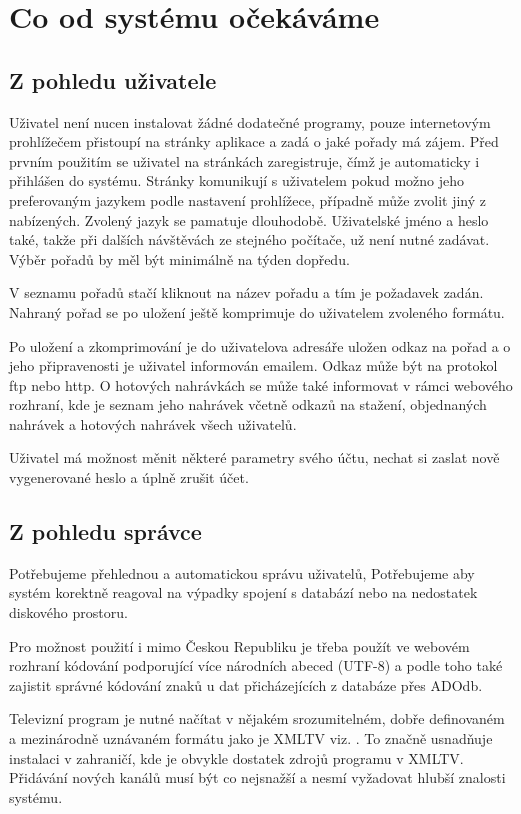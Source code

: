 \chapter{Co od systému očekáváme}

\section{Z pohledu uživatele}
Uživatel není nucen instalovat žádné dodatečné programy, pouze internetovým prohlížečem přistoupí na stránky aplikace a zadá o jaké pořady má zájem. Před prvním použitím se uživatel na stránkách zaregistruje, čímž je automaticky i přihlášen do systému. Stránky komunikují s uživatelem pokud možno jeho preferovaným jazykem podle nastavení prohlížece, případně může zvolit jiný z nabízených. Zvolený jazyk se pamatuje dlouhodobě. Uživatelské jméno a heslo také, takže při dalších návštěvách ze stejného počítače, už není nutné zadávat. Výběr pořadů by měl být minimálně na týden dopředu.

\vspace{10pt}

V seznamu pořadů stačí kliknout na název pořadu a tím je požadavek zadán. Nahraný pořad se po uložení ještě komprimuje do uživatelem zvoleného formátu.

\vspace{10pt}

Po uložení a zkomprimování je do uživatelova adresáře uložen odkaz na pořad a o jeho připravenosti je uživatel informován emailem. Odkaz může být na protokol ftp nebo http. O hotových nahrávkách se může také informovat v rámci webového rozhraní, kde je seznam jeho nahrávek včetně odkazů na stažení, objednaných nahrávek a hotových nahrávek všech uživatelů.

\vspace{10pt}

Uživatel má možnost měnit některé parametry svého účtu, nechat si zaslat nově vygenerované heslo a úplně zrušit účet.

\vspace{10pt}

\section{Z pohledu správce}
Potřebujeme přehlednou a automatickou správu uživatelů, Potřebujeme aby systém korektně reagoval na výpadky spojení s databází nebo na nedostatek diskového prostoru.

Pro možnost použití i mimo Českou Republiku je třeba použít ve webovém rozhraní kódování podporující více národních abeced (UTF-8) a podle toho také zajistit správné kódování znaků u dat přicházejících z databáze přes ADOdb. 

Televizní program je nutné načítat v nějakém srozumitelném, dobře definovaném a mezinárodně uznávaném formátu jako je XMLTV viz. \cite{xmltvURL}. To značně usnadňuje instalaci v zahraničí, kde je obvykle dostatek zdrojů programu v XMLTV. Přidávání nových kanálů musí být co nejsnažší a nesmí vyžadovat hlubší znalosti systému.

\vspace{10pt}

